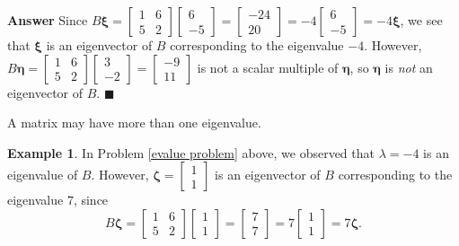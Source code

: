 \documentclass[12pt,letterpaper]{book}
\numberwithin{equation}{section}
\theoremstyle{definition}
\newtheorem{example}[thm]{\textbf{Example}}
\newenvironment{answer}{\noindent\textbf{Answer}}{\hfill$\blacksquare$\vspace{0.1in}}
\newcommand{\vxi}{\bm{\xi}}
\newcommand{\veta}{\bm{\eta}}
\begin{document}
\begin{answer}
Since $B\vxi=\left[\begin{array}{rr} 1 & 6 \\ 5 & 2
\end{array}\right]\left[\begin{array}{r} 6 \\
-5 \end{array}\right]=\left[\begin{array}{r} -24 \\
20 \end{array}\right]=-4\left[\begin{array}{r} 6 \\
-5 \end{array}\right]=-4\vxi$, we see that $\vxi$ is an eigenvector of $B$ corresponding to the eigenvalue $-4$. However,
$B\veta=\left[\begin{array}{rr} 1 & 6 \\ 5 & 2
\end{array}\right]\left[\begin{array}{r} 3 \\
-2 \end{array}\right]=\left[\begin{array}{r} -9 \\
11 \end{array}\right]$ is not a scalar multiple of $\veta$, so $\veta$ is \textit{not} an eigenvector of $B$.
\end{answer}

A matrix may have more than one eigenvalue.

\begin{example}\label{second evalue} In Problem \ref{evalue problem} above, we observed that
$\lambda=-4$ is an eigenvalue of $B$. However, $\bm{\zeta}=\left[\begin{array}{r} 1 \\
1 \end{array}\right]$ is an eigenvector of $B$ corresponding to the
eigenvalue $7$, since
$$B\bm{\zeta}=\left[\begin{array}{rr} 1 & 6 \\ 5 & 2
\end{array}\right]\left[\begin{array}{r} 1 \\
1 \end{array}\right]=\left[\begin{array}{r} 7 \\
7 \end{array}\right]=7\left[\begin{array}{r} 1 \\
1 \end{array}\right]=7\bm{\zeta}.$$
\end{example}
\end{document}
